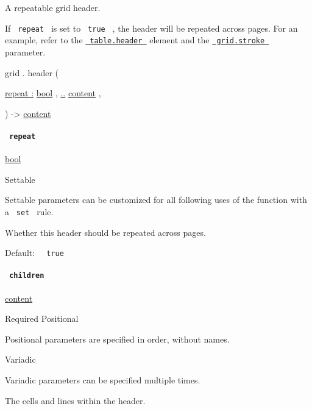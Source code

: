 A repeatable grid header.

If \texttt{\ repeat\ } is set to \texttt{\ true\ } , the header will be
repeated across pages. For an example, refer to the
\href{/docs/reference/model/table/\#definitions-header}{\texttt{\ table.header\ }}
element and the
\href{/docs/reference/layout/grid/\#parameters-stroke}{\texttt{\ grid.stroke\ }}
parameter.

grid { . } { header } (

{ \hyperref[definitions-header-parameters-repeat]{repeat :}
\href{/docs/reference/foundations/bool/}{bool} , } {
\hyperref[definitions-header-parameters-children]{..}
\href{/docs/reference/foundations/content/}{content} , }

) -\textgreater{} \href{/docs/reference/foundations/content/}{content}

\paragraph{\texorpdfstring{\texttt{\ repeat\ }}{ repeat }}\label{definitions-header-repeat}

\href{/docs/reference/foundations/bool/}{bool}

{{ Settable }}

\label{definitions-header-repeat-settable-tooltip}
Settable parameters can be customized for all following uses of the
function with a \texttt{\ set\ } rule.

Whether this header should be repeated across pages.

Default: \texttt{\ }{\texttt{\ true\ }}\texttt{\ }

\paragraph{\texorpdfstring{\texttt{\ children\ }}{ children }}\label{definitions-header-children}

\href{/docs/reference/foundations/content/}{content}

{Required} {{ Positional }}

\label{definitions-header-children-positional-tooltip}
Positional parameters are specified in order, without names.

{{ Variadic }}

\label{definitions-header-children-variadic-tooltip}
Variadic parameters can be specified multiple times.

The cells and lines within the header.

